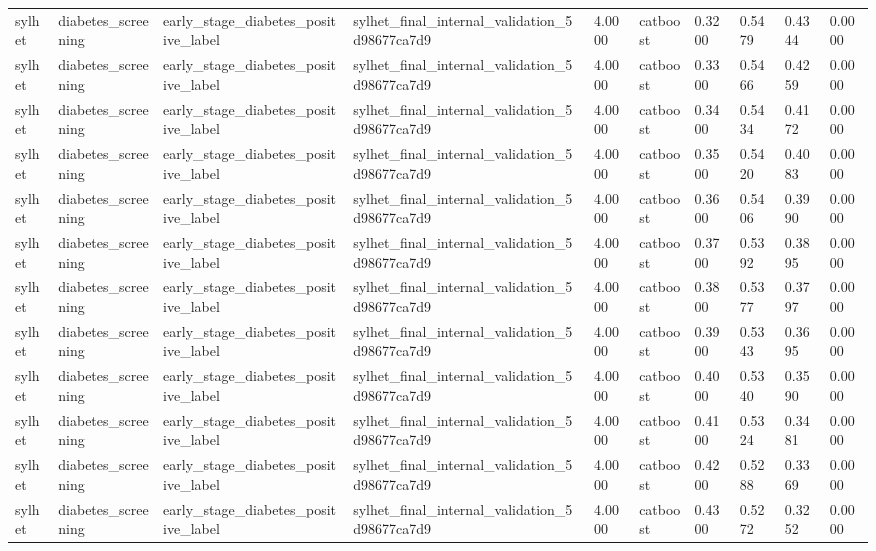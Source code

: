 \begin{tabular}{llllllllll}
sylhet & diabetes\_screening & early\_stage\_diabetes\_positive\_label & sylhet\_final\_internal\_validation\_5d98677ca7d9 & 4.0000 & catboost & 0.3200 & 0.5479 & 0.4344 & 0.0000 \\
sylhet & diabetes\_screening & early\_stage\_diabetes\_positive\_label & sylhet\_final\_internal\_validation\_5d98677ca7d9 & 4.0000 & catboost & 0.3300 & 0.5466 & 0.4259 & 0.0000 \\
sylhet & diabetes\_screening & early\_stage\_diabetes\_positive\_label & sylhet\_final\_internal\_validation\_5d98677ca7d9 & 4.0000 & catboost & 0.3400 & 0.5434 & 0.4172 & 0.0000 \\
sylhet & diabetes\_screening & early\_stage\_diabetes\_positive\_label & sylhet\_final\_internal\_validation\_5d98677ca7d9 & 4.0000 & catboost & 0.3500 & 0.5420 & 0.4083 & 0.0000 \\
sylhet & diabetes\_screening & early\_stage\_diabetes\_positive\_label & sylhet\_final\_internal\_validation\_5d98677ca7d9 & 4.0000 & catboost & 0.3600 & 0.5406 & 0.3990 & 0.0000 \\
sylhet & diabetes\_screening & early\_stage\_diabetes\_positive\_label & sylhet\_final\_internal\_validation\_5d98677ca7d9 & 4.0000 & catboost & 0.3700 & 0.5392 & 0.3895 & 0.0000 \\
sylhet & diabetes\_screening & early\_stage\_diabetes\_positive\_label & sylhet\_final\_internal\_validation\_5d98677ca7d9 & 4.0000 & catboost & 0.3800 & 0.5377 & 0.3797 & 0.0000 \\
sylhet & diabetes\_screening & early\_stage\_diabetes\_positive\_label & sylhet\_final\_internal\_validation\_5d98677ca7d9 & 4.0000 & catboost & 0.3900 & 0.5343 & 0.3695 & 0.0000 \\
sylhet & diabetes\_screening & early\_stage\_diabetes\_positive\_label & sylhet\_final\_internal\_validation\_5d98677ca7d9 & 4.0000 & catboost & 0.4000 & 0.5340 & 0.3590 & 0.0000 \\
sylhet & diabetes\_screening & early\_stage\_diabetes\_positive\_label & sylhet\_final\_internal\_validation\_5d98677ca7d9 & 4.0000 & catboost & 0.4100 & 0.5324 & 0.3481 & 0.0000 \\
sylhet & diabetes\_screening & early\_stage\_diabetes\_positive\_label & sylhet\_final\_internal\_validation\_5d98677ca7d9 & 4.0000 & catboost & 0.4200 & 0.5288 & 0.3369 & 0.0000 \\
sylhet & diabetes\_screening & early\_stage\_diabetes\_positive\_label & sylhet\_final\_internal\_validation\_5d98677ca7d9 & 4.0000 & catboost & 0.4300 & 0.5272 & 0.3252 & 0.0000 \\

\end{tabular}
